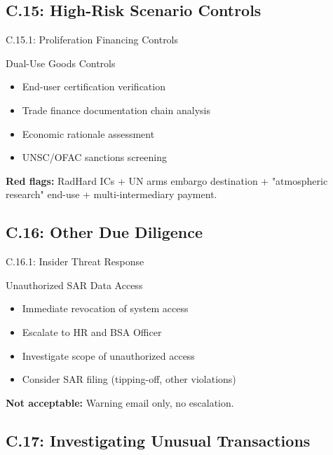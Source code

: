 \documentclass{beamer}
\begin{document}
		\subsection{C.15: High-Risk Scenario Controls}
		
		\begin{frame}{C.15.1: Proliferation Financing Controls}
			\begin{block}{Dual-Use Goods Controls}
				\begin{itemize}
					\item End-user certification verification
					\item Trade finance documentation chain analysis
					\item Economic rationale assessment
					\item UNSC/OFAC sanctions screening
				\end{itemize}
			\end{block}
			\textbf{Red flags:} RadHard ICs + UN arms embargo destination + "atmospheric research" end-use + multi-intermediary payment.
		\end{frame}
		
		\subsection{C.16: Other Due Diligence}
		
		\begin{frame}{C.16.1: Insider Threat Response}
			\begin{block}{Unauthorized SAR Data Access}
				\begin{itemize}
					\item Immediate revocation of system access
					\item Escalate to HR and BSA Officer
					\item Investigate scope of unauthorized access
					\item Consider SAR filing (tipping-off, other violations)
				\end{itemize}
			\end{block}
			\textbf{Not acceptable:} Warning email only, no escalation.
		\end{frame}
		
		\subsection{C.17: Investigating Unusual Transactions}
		
\end{document}
